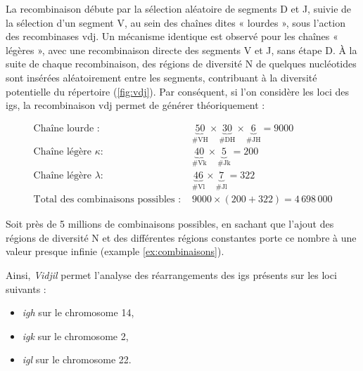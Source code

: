 \vspace{1em}

La recombinaison débute par la sélection aléatoire de segments D et J, suivie de la sélection d'un segment V, au sein des chaînes dites « lourdes », 
sous l'action des recombinases \gls{vdj}. Un mécanisme identique est observé pour les chaînes « légères », avec une recombinaison directe des segments V et J, 
sans étape D. À la suite de chaque recombinaison, des régions de diversité N de quelques nucléotides sont insérées aléatoirement entre les segments, 
contribuant à la diversité potentielle du répertoire (\autoref{fig:vdj}). Par conséquent, si l'on considère les loci des \glspl{ig}, la recombinaison \gls{vdj} 
permet de générer théoriquement : 

\begin{examplebox}[label={ex:combinaisons}]
    \begin{equation}
        \begin{aligned}
        \text{Chaîne lourde : } & \underbrace{50}_{\text{\# VH}} \times \underbrace{30}_{\text{\# DH}} \times \underbrace{6}_{\text{\# JH}} = 9000 \\
        \text{Chaîne légère } \kappa : & \underbrace{40}_{\text{\# Vk}} \times \underbrace{5}_{\text{\# Jk}} = 200 \\
        \text{Chaîne légère } \lambda : & \underbrace{46}_{\text{\# Vl}} \times \underbrace{7}_{\text{\# Jl}} = 322 \\
        \text{Total des combinaisons possibles : } & 9000 \times (200 + 322) = 4\,698\,000
        \end{aligned}
    \end{equation}
\end{examplebox}

Soit près de 5 millions de combinaisons possibles, en sachant que l'ajout des régions de diversité N
et des différentes régions constantes porte ce nombre à une valeur presque infinie (example \autoref{ex:combinaisons}).

\vspace{1em}

Ainsi, \textit{Vidjil} permet l'analyse des réarrangements des \glspl{ig} présents sur les loci suivants : 
\begin{itemize}
    \item \textit{\gls{igh}} sur le chromosome 14, 
    \item \textit{\gls{igk}} sur le chromosome 2, 
    \item \textit{\gls{igl}} sur le chromosome 22.
\end{itemize}

